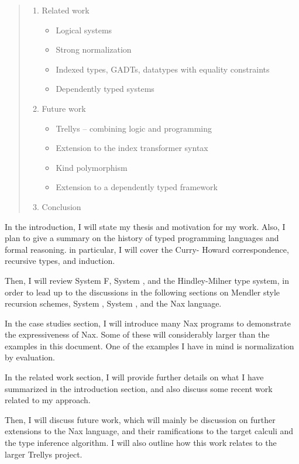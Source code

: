 \begin{quote}
\begin{enumerate}[1.]
\item Related work
  \begin{itemize}
    \item Logical systems
    \item Strong normalization
    \item Indexed types, GADTs, datatypes with equality constraints
    \item Dependently typed systems
  \end{itemize}
  
\item Future work
  \begin{itemize}
    \item Trellys -- combining logic and programming
    \item Extension to the index transformer syntax
    \item Kind polymorphism
    \item Extension to a dependently typed framework
 \end{itemize}
 
\item Conclusion
\end{enumerate}
\end{quote}

In the introduction, I will state my thesis and motivation for my work.
Also, I plan to give a summary on the history of typed programming
languages and formal reasoning. in particular, I will cover the Curry-
Howard correspondence, recursive types, and induction.

Then, I will review System \textsf{F}, System \Fw, and the Hindley-Milner
type system, in order to lead up to the discussions in the following
sections on Mendler style recursion schemes, System \Fi, System \Fixi, and
the Nax language.

In the case studies section, I will introduce many Nax programs to
demonstrate the expressiveness of Nax. Some of these will considerably
larger than the examples in this document. One of the examples I have in
mind is normalization by evaluation.

In the related work section, I will provide further details on what I have
summarized in the introduction section, and also discuss some recent work
related to my approach.

Then, I will discuss future work, which will mainly be discussion on further
extensions to the Nax language, and their ramifications to
the target calculi and the type inference algorithm. I will also
outline how this work relates to the larger Trellys project.

